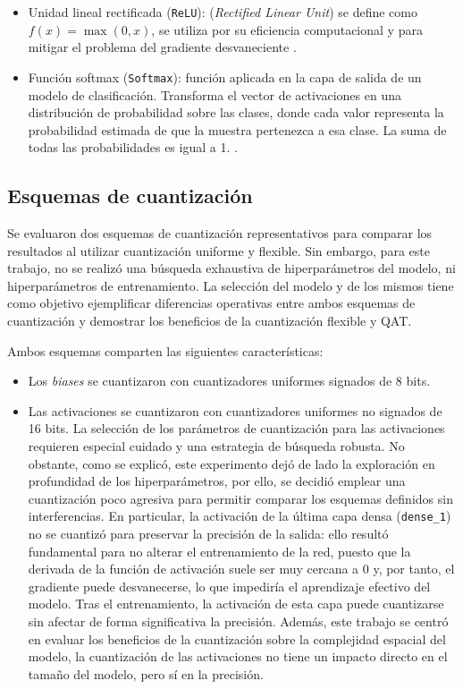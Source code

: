 \begin{itemize}
    \item Unidad lineal rectificada (\texttt{ReLU}): (\textit{Rectified Linear Unit}) se define como $f(x)=\max(0,x)$, se utiliza por su eficiencia computacional y para mitigar el problema del gradiente desvaneciente \cite{Nair2010}.

    \item Función softmax (\texttt{Softmax}): función aplicada en la capa de salida de un modelo de clasificación. Transforma el vector de activaciones en una distribución de probabilidad sobre las clases, donde cada valor representa la probabilidad estimada de que la muestra pertenezca a esa clase. La suma de todas las probabilidades es igual a 1. \cite{Bridle1990}.
\end{itemize}

\subsection{Esquemas de cuantización}

Se evaluaron dos esquemas de cuantización representativos para comparar los resultados al utilizar cuantización uniforme y flexible. Sin embargo, para este trabajo, no se realizó una búsqueda exhaustiva de hiperparámetros del modelo, ni hiperparámetros de entrenamiento. La selección del modelo y de los mismos tiene como objetivo ejemplificar diferencias operativas entre ambos esquemas de cuantización y demostrar los beneficios de la cuantización flexible y QAT.

Ambos esquemas comparten las siguientes características:
\begin{itemize}
\item Los \textit{biases} se cuantizaron con cuantizadores uniformes signados de 8 bits.
\item Las activaciones se cuantizaron con cuantizadores uniformes no signados de 16 bits. La selección de los parámetros de cuantización para las activaciones requieren especial cuidado y una estrategia de búsqueda robusta. No obstante, como se explicó, este experimento dejó de lado la exploración en profundidad de los hiperparámetros, por ello, se decidió emplear una cuantización poco agresiva para permitir comparar los esquemas definidos sin interferencias. En particular, la activación de la última capa densa (\texttt{dense\_1}) no se cuantizó para preservar la precisión de la salida: ello resultó fundamental para no alterar el entrenamiento de la red, puesto que la derivada de la función de activación suele ser muy cercana a $0$ y, por tanto, el gradiente puede desvanecerse, lo que impediría el aprendizaje efectivo del modelo. Tras el entrenamiento, la activación de esta capa puede cuantizarse sin afectar de forma significativa la precisión. Además, este trabajo se centró en evaluar los beneficios de la cuantización sobre la complejidad espacial del modelo, la cuantización de las activaciones no tiene un impacto directo en el tamaño del modelo, pero s\'i en la precisión.
\end{itemize}

